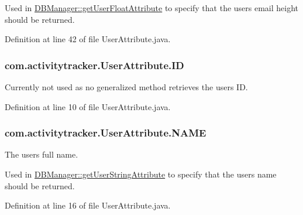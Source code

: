 Used in \hyperlink{classcom_1_1activitytracker_1_1_d_b_manager_a98df66254bec4d74b29cfe468a9fc794}{D\+B\+Manager\+::get\+User\+Float\+Attribute} to specify that the user\textquotesingle{}s email height should be returned. 

Definition at line 42 of file User\+Attribute.\+java.

\subsubsection[{\texorpdfstring{ID}{ID}}]{\setlength{\rightskip}{0pt plus 5cm}com.\+activitytracker.\+User\+Attribute.\+ID}\hypertarget{enumcom_1_1activitytracker_1_1_user_attribute_a82c5680d15b629e939afcd98a39abf76}{}\label{enumcom_1_1activitytracker_1_1_user_attribute_a82c5680d15b629e939afcd98a39abf76}
Currently not used as no generalized method retrieves the user\textquotesingle{}s ID. 

Definition at line 10 of file User\+Attribute.\+java.

\subsubsection[{\texorpdfstring{N\+A\+ME}{NAME}}]{\setlength{\rightskip}{0pt plus 5cm}com.\+activitytracker.\+User\+Attribute.\+N\+A\+ME}\hypertarget{enumcom_1_1activitytracker_1_1_user_attribute_aac51a5dfcaaa9e5304d37d74fc888af4}{}\label{enumcom_1_1activitytracker_1_1_user_attribute_aac51a5dfcaaa9e5304d37d74fc888af4}
The user\textquotesingle{}s full name.

Used in \hyperlink{classcom_1_1activitytracker_1_1_d_b_manager_a20f726c054d6c8a6fc3ce629d87f1114}{D\+B\+Manager\+::get\+User\+String\+Attribute} to specify that the user\textquotesingle{}s name should be returned. 

Definition at line 16 of file User\+Attribute.\+java.

